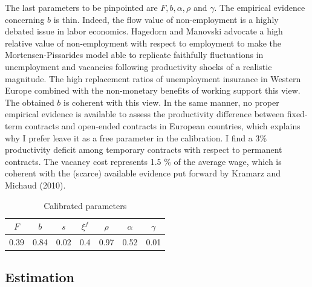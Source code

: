 \documentclass[a4paper]{article}
\begin{document}
The last parameters to be pinpointed are $F,b,\alpha,\rho$ and $\gamma$. The empirical evidence concerning $b$ is thin. Indeed, the flow value of non-employment is a highly debated issue in labor economics. Hagedorn and Manovski \cite{hagedorn2008cyclical} advocate a high relative value of non-employment with respect to employment to make the Mortensen-Pissarides model able to replicate faithfully fluctuations in unemployment and vacancies following productivity shocks of a  realistic magnitude. The high replacement ratios of unemployment insurance in Western Europe combined with the non-monetary benefits of working support this view. The obtained $b$ is coherent with this view. In the same manner, no proper empirical evidence is available to assess the productivity difference between fixed-term contracts and open-ended contracts in European countries, which explains why I prefer leave it as a free parameter in the calibration. I find a 3\% productivity deficit among temporary contracts with respect to permanent contracts. The vacancy cost represents 1.5 \% of the average wage, which is coherent with the (scarce) available evidence put forward by Kramarz and Michaud (2010).

\begin{table}[H]
\centering
\begin{tabular}{|c c c c c c c|}
\hline
$F$ & $b$ & $s$ & $\xi^f$ & $\rho$ & $\alpha$ & $\gamma$\\
\hline
0.39 & 0.84 & 0.02 & 0.4 & 0.97 & 0.52 & 0.01\\
\hline
\end{tabular}
\caption{Calibrated parameters\label{calibrated}}
\end{table}

\subsection{Estimation}
\end{document}
